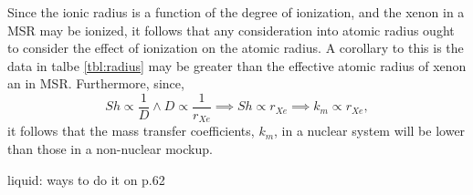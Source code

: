 Since the ionic radius is a function of the degree of ionization, and the xenon in a MSR may be ionized, it follows that any consideration into atomic radius ought to consider the effect of ionization on the atomic radius.  A corollary to this is the data in talbe \ref{tbl:radius} may be greater than the effective atomic radius of xenon an in MSR.  Furthermore, since,
\begin{equation}
    Sh \propto \frac{1}{D} \wedge D \propto \frac{1}{r_{Xe}} \implies Sh \propto r_{Xe} \implies k_m \propto r_{Xe},
\end{equation}
it follows that the mass transfer coefficients, $k_m$, in a nuclear system will be lower than those in a non-nuclear mockup. 

liquid: ways to do it on p.62